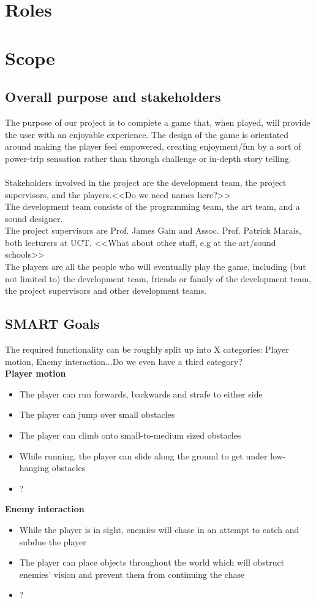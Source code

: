 \documentclass[a4paper,10pt]{article}
\begin{document}
\section{Roles}

\section{Scope}
\subsection{Overall purpose and stakeholders}
The purpose of our project is to complete a game that, when played, will provide the user with an enjoyable experience. The design of the game is orientated around making the player feel empowered, creating enjoyment/fun by a sort of power-trip sensation rather than through challenge or in-depth story telling.
\\ \\
Stakeholders involved in the project are the development team, the project supervisors, and the players.<<Do we need names here?>> \\
The development team consists of the programming team, the art team, and a sound designer. \\
The project supervisors are Prof. James Gain and Assoc. Prof. Patrick Marais, both lecturers at UCT. <<What about other staff, e.g at the art/sound schools>> \\
The players are all the people who will eventually play the game, including (but not limited to) the development team, friends or family of the development team, the project supervisors and other development teams.

\subsection{SMART Goals}
The required functionality can be roughly split up into X categories: Player motion, Enemy interaction...Do we even have a third category? \\
\textbf{Player motion}
\begin{itemize}
	\item The player can run forwards, backwards and strafe to either side
	\item The player can jump over small obstacles
	\item The player can climb onto small-to-medium sized obstacles
	\item While running, the player can slide along the ground to get under low-hanging obstacles
	\item ?
\end{itemize}
\textbf{Enemy interaction}
\begin{itemize}
	\item While the player is in sight, enemies will chase in an attempt to catch and subdue the player
	\item The player can place objects throughout the world which will obstruct enemies' vision and prevent them from continuing the chase
	\item ?
\end{itemize}
\end{document}
